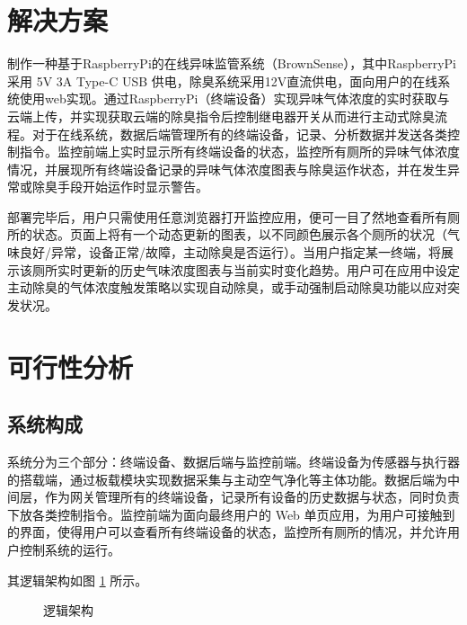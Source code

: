 \documentclass[degree=course]{sjtuthesis}
\begin{document}
\section{解决方案}
制作一种基于RaspberryPi的在线异味监管系统（BrownSense），其中RaspberryPi采用 5V 3A Type-C USB 供电，除臭系统采用12V直流供电，面向用户的在线系统使用web实现。通过RaspberryPi（终端设备）实现异味气体浓度的实时获取与云端上传，并实现获取云端的除臭指令后控制继电器开关从而进行主动式除臭流程。对于在线系统，数据后端管理所有的终端设备，记录、分析数据并发送各类控制指令。监控前端上实时显示所有终端设备的状态，监控所有厕所的异味气体浓度情况，并展现所有终端设备记录的异味气体浓度图表与除臭运作状态，并在发生异常或除臭手段开始运作时显示警告。

部署完毕后，用户只需使用任意浏览器打开监控应用，便可一目了然地查看所有厕所的状态。页面上将有一个动态更新的图表，以不同颜色展示各个厕所的状况（气味良好/异常，设备正常/故障，主动除臭是否运行）。当用户指定某一终端，将展示该厕所实时更新的历史气味浓度图表与当前实时变化趋势。用户可在应用中设定主动除臭的气体浓度触发策略以实现自动除臭，或手动强制启动除臭功能以应对突发状况。
\section{可行性分析}
\subsection{系统构成}
系统分为三个部分：终端设备、数据后端与监控前端。终端设备为传感器与执行器的搭载端，通过板载模块实现数据采集与主动空气净化等主体功能。数据后端为中间层，作为网关管理所有的终端设备，记录所有设备的历史数据与状态，同时负责下放各类控制指令。监控前端为面向最终用户的 Web 单页应用，为用户可接触到的界面，使得用户可以查看所有终端设备的状态，监控所有厕所的情况，并允许用户控制系统的运行。

其逻辑架构如图 \ref{fig:diagram} 所示。
\begin{figure}[h]
    \noindent{}
    \caption{逻辑架构}\label{fig:diagram}
\end{figure}
\end{document}
